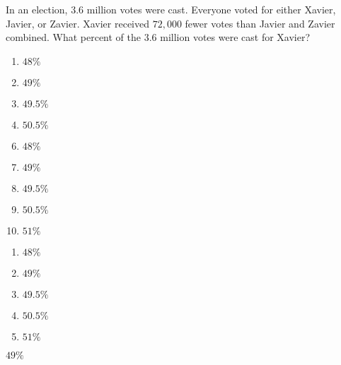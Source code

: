 In an election, $3.6$ million votes were cast.  Everyone voted
for either Xavier, Javier, or Zavier.  Xavier received $72,000$
fewer votes than Javier and Zavier combined.  What percent
of the $3.6$ million votes were cast for Xavier?



\ifsat
	\begin{enumerate}[label=\Alph*)]
		\item $48\%$
		\item $49\%$%
		\item $49.5\%$
		\item $50.5\%$
	\end{enumerate}
\else
\fi

\ifacteven
	\begin{enumerate}[label=\textbf{\Alph*.},itemsep=\fill,align=left]
		\setcounter{enumii}{5}
		\item $48\%$
		\item $49\%$%
		\item $49.5\%$
		\addtocounter{enumii}{1}
		\item $50.5\%$
		\item $51\%$
	\end{enumerate}
\else
\fi

\ifactodd
	\begin{enumerate}[label=\textbf{\Alph*.},itemsep=\fill,align=left]
		\item $48\%$
		\item $49\%$%
		\item $49.5\%$
		\item $50.5\%$
		\item $51\%$
	\end{enumerate}
\else
\fi

\ifgridin
 $49\%$%
		
\else
\fi

